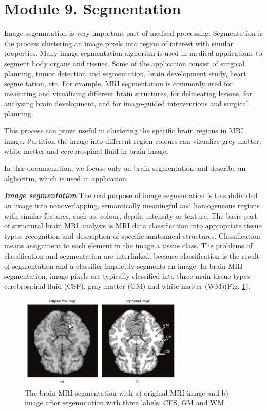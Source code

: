 \section{Module 9. Segmentation}

Image segemntation is very important part of medical processing. Segmentation is the process clustering an image pixels into region of interest with similar properties. Many image segmentation alghoritm is used in medical applications to segment body organs and tissues. Some of the application  consist of surgical planning, tumor detection and segmentation, brain development study, heart segme tation, etc. For example, MRI segmentation is commonly used for measuring and visualizing different brain structures, for delineating lesions, for analysing brain development, and for image-guided interventions and surgical planning.  

This process can prove useful in clustering the specific brain regions in MRI image. Partition the image into different region colours can vizualize grey matter, white metter and cerebrospinal fluid in brain image. 

In this documenation, we focuse only on brain segmentation and describe an alghoritm, which is used in application.

\textbf{\textit{Image segmentation}}
The real purpose of image segmentation is to subdivided an image into nonoverlapping, semantically meaningful and homogeneous regions with similar features, such as: colour, depth, intensity or texture. The basic part of structural brain MRI analysis  is MRI data classification into appropriate tissue types, recognition and description of specific anatomical structures.
Classification means assignment to each element in the image a tissue class. The problems of classification and segmentation are interlinked, because classification is the result of segmentation and  a classifier implicitly segments an image. In brain MRI segmentation, image pixels are typically classified into three main tissue types:  cerebrospinal fluid (CSF), gray matter (GM)  and white matter (WM)(Fig. \ref{fig:figures/m09_1}). 

\begin{figure}[H]
\centering{}\includegraphics[width=0.7\textwidth]{figures/Module_09/m09_1} \caption{The brain MRI segmentation with a) original MRI image and b) image after segemntation with three labels: CFS, GM and WM  \label{fig:figures/m09_1}}
\end{figure}

